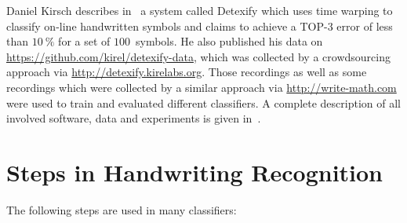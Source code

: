\documentclass[9pt,technote]{IEEEtran}
\begin{document}
Daniel Kirsch describes in~\cite{Kirsch} a system called Detexify which uses
time warping to classify on-line handwritten symbols and claims to achieve a
TOP-3 error of less than $\SI{10}{\percent}$ for a set of $\num{100}$~symbols.
He also published his data on \url{https://github.com/kirel/detexify-data},
which was collected by a crowdsourcing approach via
\url{http://detexify.kirelabs.org}. Those recordings as well as some recordings
which were collected by a similar approach via \url{http://write-math.com} were
used to train and evaluated different classifiers. A complete description of
all involved software, data and experiments is given in~\cite{Thoma:2014}.

\section{Steps in Handwriting Recognition}
The following steps are used in many classifiers:
\end{document}
